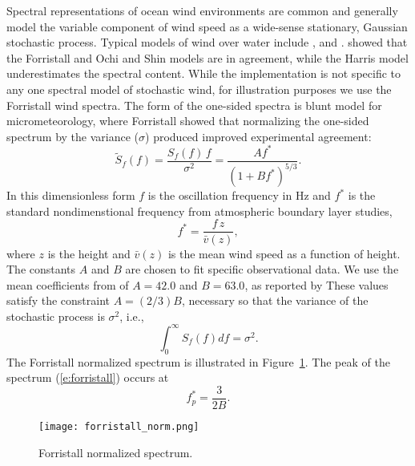 \documentclass[utf8]{frontiersSCNS} %
\begin{document}
Spectral representations of ocean wind environments are common and generally model the variable component of wind speed as a wide-sense stationary, Gaussian stochastic process.  Typical models of wind over water include \citet{harris71nature}, \citet{forristall88wind} and \citet{ochi13wind}. \citet{cole18reactive} showed that the Forristall and Ochi and Shin models are in agreement, while the Harris model underestimates the spectral content.  While the implementation is not specific to any one spectral model of stochastic wind, for illustration purposes we use the Forristall wind spectra.  The form of the one-sided spectra is \citet{olesen84modelling} blunt model for micrometeorology, where Forristall showed that normalizing the one-sided spectrum by the variance ($\sigma$) produced improved experimental agreement:
\begin{equation}
  \widetilde{S}_f(f) = \frac{S_f(f)\,f}{\sigma^2}  = \frac{ A f^*}{( 1 + B f^*)^{5/3}}.
    \label{e:forristall}
    \end{equation}
    In this dimensionless form $f$ is the oscillation frequency in \unit[]{Hz} and $f^*$ is the standard nondimenstional frequency from atmospheric boundary layer studies,
\begin{equation}
  f^* = \frac{f \, z}{\bar{v}(z)},
\end{equation}
where $z$ is the height and $\bar{v}(z)$ is the mean wind speed as a function of height. The constants $A$ and $B$ are chosen to fit specific observational data.  We use the mean coefficients from of $A=42.0$ and $B=63.0$, as reported by \citet{forristall88wind}  These values satisfy the constraint $A=(2/3)B$, necessary so that the variance of the stochastic process is $\sigma^2$, i.e.,
\begin{equation}
  \int_0^{\infty} S_f(f) df = \sigma^2.
\end{equation}
The Forristall normalized spectrum is illustrated in Figure~\ref{f:forristall_norm}.   The peak of the spectrum (\ref{e:forristall}) occurs at
\begin{equation}
f^*_p = \frac{3}{2B}.
\end{equation}
\begin{figure}[h!]
  \centering
  \texttt{[image: forristall\_norm.png]}
  \caption{Forristall normalized spectrum.}
  \label{f:forristall_norm}
\end{figure}
\end{document}
